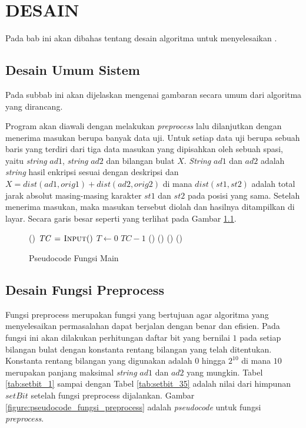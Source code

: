 \chapter{DESAIN}
\label{chapter:desain}

Pada bab ini akan dibahas tentang desain algoritma untuk menyelesaikan \problem{}.
\section{Desain Umum Sistem}
Pada subbab ini akan dijelaskan mengenai gambaran secara umum dari algoritma yang dirancang.

Program akan diawali dengan melakukan \textit{preprocess} lalu dilanjutkan dengan menerima masukan berupa banyak data uji. Untuk setiap data uji berupa sebuah baris yang terdiri dari tiga data masukan yang dipisahkan oleh sebuah spasi, yaitu \textit{string} $ad1$, \textit{string} $ad2$ dan bilangan bulat $X$. \textit{String} $ad1$ dan $ad2$ adalah \textit{string} hasil enkripsi sesuai dengan deskripsi \problem{} dan $X=dist(ad1, orig1) + dist(ad2, orig2)$ di mana $dist(st1, st2)$ adalah total jarak absolut masing-masing karakter $st1$ dan $st2$ pada posisi yang sama. Setelah menerima masukan, maka masukan tersebut diolah dan hasilnya ditampilkan di layar. Secara garis besar seperti yang terlihat pada Gambar \ref{figure:fungsi_main}. 

\begin{figure}
	\begin{mdframed}
		\begin{codebox}
			\li {}()
			\li $\id{TC} \gets \proc{Input}()$
			\li \For $T \gets 0$ \To $TC - 1$ \Do
			\li 	{}()			
			\li 	\proc{init}()
			\li 	{}()
			\li 	{}()
			\End
		\end{codebox}
	\end{mdframed}
	\caption{Pseudocode Fungsi Main}
	\label{figure:fungsi_main}
\end{figure}

\section{Desain Fungsi Preprocess}
\label{sec:desain_fungsi_preprocess}
Fungsi preprocess merupakan fungsi yang bertujuan agar algoritma yang menyelesaikan permasalahan dapat berjalan dengan benar dan efisien. Pada fungsi ini akan dilakukan perhitungan daftar bit yang bernilai $1$ pada setiap bilangan bulat dengan konstanta rentang bilangan yang telah ditentukan. Konstanta rentang bilangan yang digunakan adalah $0$ hingga $2^{10}$ di mana $10$ merupakan panjang maksimal \textit{string} $ad1$ dan $ad2$ yang mungkin. Tabel \ref{tab:setbit_1} sampai dengan Tabel \ref{tab:setbit_35} adalah nilai dari himpunan $ setBit $ setelah fungsi preprocess dijalankan. Gambar \ref{figure:pseudocode_fungsi_preprocess} adalah \textit{pseudocode} untuk fungsi \textit{preprocess}.

